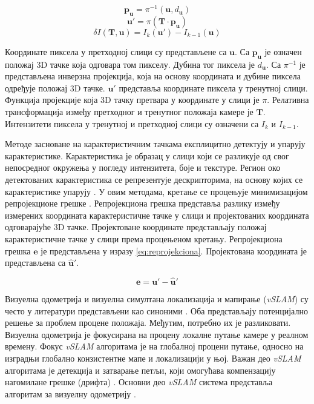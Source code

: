 \documentclass[12pt]{article}
\begin{document}
\begin{equation}
	\mathbf{p}_{\mathbf{u}}
	=
	\pi^{-1}\left(\mathbf{u}, d_{\mathbf{u}}\right)
	\label{eq:fotometrijska-1}
\end{equation}
\begin{equation}
	\mathbf{u}'
	=
	\pi(\mathbf{T} \cdot
	\mathbf{p}_{\mathbf{u}})
	\label{eq:fotometrijska-2}
\end{equation}
\begin{equation}
	\delta I\left(\mathbf{T}, \mathbf{u}\right)
	=
	I_k\left(\mathbf{u}'\right)
	-
	I_{k-1}\left(\mathbf{u}\right)
	\label{eq:fotometrijska-3}
\end{equation}

Координате пиксела у претходној слици су представљене са $\mathbf{u}$. Са
$\mathbf{p}_{\mathbf{u}}$ је означен положај 3D тачке која одговара том
пикселу. Дубина тог пиксела је $d_{\mathbf{u}}$. Са $\pi^{-1}$ је представљена
инверзна пројекција, која на основу координата и дубине пиксела одређује
положај 3D тачке. $\mathbf{u}'$ представља координате пиксела у тренутној
слици. Функција пројекције која 3D тачку претвара у координате у слици је
$\pi$. Релативна трансформација између претходног и тренутног положаја камере
је $\mathbf{T}$. Интензитети пиксела у тренутној и претходној слици су означени
са $I_k$ и $I_{k-1}$.

Методе засноване на карактеристичним тачкама експлицитно детектују и упарују
карактеристике. Карактеристика је образац у слици који се разликује од свог
непосредног окружења у погледу интензитета, боје и текстуре. Регион око
детектованих карактеристика се репрезентује дескрипторима, на основу којих се
карактеристике упарују \cite{scaramuzza2011visual}. У овим методама, кретање се
процењује минимизацијом репројекционе грешке \cite{he2020spatiotemporal}.
Репројекциона грешка представља разлику између измерених координата
карактеристичне тачке у слици и пројектованих координата одговарајуће 3D тачке.
Пројектоване координате представљају положај карактеристичне тачке у слици
према процењеном кретању. Репројекциона грешка $\mathbf{e}$ је представљена у
изразу \eqref{eq:reprojekciona}. Пројектована координата је представљена са 
$\hat{\mathbf{u}}'$.

\begin{equation}
    \mathbf{e} = \mathbf{u}' - \hat{\mathbf{u}}'
    \label{eq:reprojekciona}
\end{equation}

Визуелна одометрија и визуелна симултана локализација и мапирање
(\textit{vSLAM}) су често у литератури представљени као синоними
\cite{servieres2021vslam}. Оба представљају потенцијално решење за проблем
процене положаја. Међутим, потребно их је разликовати. Визуелна одометрија је
фокусирана на процену локалне путање камере у реалном времену. Фокус
\textit{vSLAM} алгоритама је на глобалној процени путање, односно на изградњи
глобално конзистентне мапе и локализацији у њој. Важан део \textit{vSLAM}
алгоритама је детекција и затварање петљи, који омогућава компензацију
нагомилане грешке (дрифта) \cite{servieres2021vslam}. Основни део
\textit{vSLAM} система представља алгоритам за визуелну одометрију
\cite{servieres2021vslam}.
\end{document}
